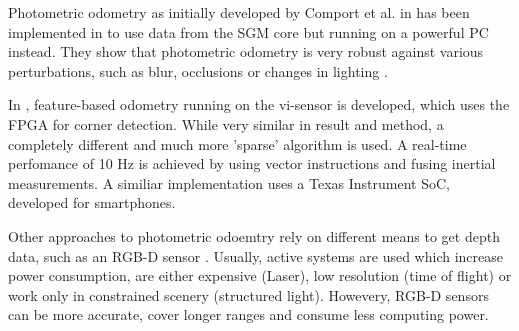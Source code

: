 Photometric odometry as initially developed by Comport et al. in
\cite{comport2007odometry} has been implemented in \cite{omaridenseodometry} to
use data from the SGM core but running on a powerful PC instead. They show that
photometric odometry is very robust against various perturbations, such as
blur, occlusions or changes in lighting \cite{comport2011asymmetric}.

In \cite{marcin2014odometry}, feature-based odometry running on the vi-sensor
is developed, which uses the FPGA for corner detection. While very similar in
result and method, a completely different and much more 'sparse' algorithm is
used. A real-time perfomance of 10 Hz is achieved by using vector instructions
and fusing inertial measurements.  A similiar implementation
\cite{goldberg2011stereo} uses a Texas Instrument SoC, developed for
smartphones.

Other approaches to photometric odoemtry rely on different means to get depth
data, such as an RGB-D sensor \cite{kerl2013robust}. Usually, active systems
are used which increase power consumption, are either expensive (Laser), low
resolution (time of flight) or work only in constrained scenery (structured
light). Howevery, RGB-D sensors can be more accurate, cover longer ranges and
consume less computing power.
